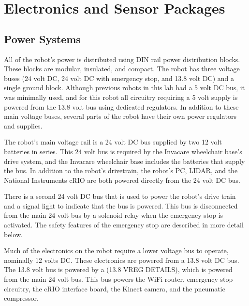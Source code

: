 \documentclass{article}
\begin{document}
\section[Electronics and Sensor Packages]{Electronics and Sensor Packages}
\subsection[Power Systems ]{Power Systems }
All of the robot{\textquoteright}s power is distributed using DIN rail power distribution blocks. These blocks are modular, insulated, and compact. The robot has three voltage buses (24 volt DC, 24 volt DC with emergency stop, and 13.8 volt DC) and a single ground block. Although previous robots in this lab had a 5 volt DC bus, it was minimally used, and for this robot all circuitry requiring a 5 volt supply is powered from the 13.8 volt bus using dedicated regulators. In addition to these main voltage buses, several parts of the robot have their own power regulators and supplies.

The robot{\textquoteright}s main voltage rail is a 24 volt DC bus supplied by two 12 volt batteries in series. This 24 volt bus is required by the Invacare wheelchair base{\textquoteright}s drive system, and the Invacare wheelchair base includes the batteries that supply the bus. In addition to the robot{\textquoteright}s drivetrain, the robot{\textquoteright}s PC, LIDAR, and the National Instruments cRIO are both powered directly from the 24 volt DC bus.

There is a second 24 volt DC bus that is used to power the robot{\textquoteright}s drive train and a signal light to indicate that the bus is powered. This bus is disconnected from the main 24 volt bus by a solenoid relay when the emergency stop is activated. The safety features of the emergency stop are described in more detail below.

Much of the electronics on the robot require a lower voltage bus to operate, nominally 12 volts DC. These electronics are powered from a 13.8 volt DC bus. The 13.8 volt bus is powered by a (13.8 VREG DETAILS), which is powered from the main 24 volt bus. This bus powers the WiFi router, emergency stop circuitry, the cRIO interface board, the Kinect camera, and the pneumatic compressor.
\end{document}
